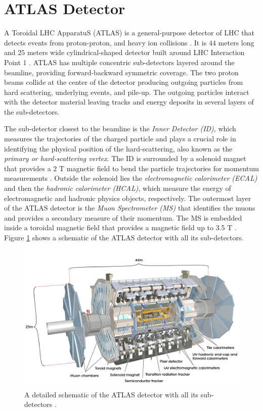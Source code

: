 \section{ATLAS Detector}
\label{sec:ATLAS}

A Toroidal LHC ApparatuS (ATLAS) is a general-purpose detector of LHC that detects events from proton-proton, and heavy ion collisions \cite{ATLAS}. It is $44$ meters long and $25$ meters wide cylindrical-shaped detector built around LHC Interaction Point 1 \cite{ATLAS}. ATLAS has multiple concentric sub-detectors layered around the beamline, providing forward-backward symmetric coverage. The two proton beams collide at the center of the detector producing outgoing particles from hard scattering, underlying events, and pile-up. The outgoing particles interact with the detector material leaving tracks and energy deposits in several layers of the sub-detectors. 

The sub-detector closest to the beamline is the \textit{Inner Detector (ID)}, which measures the trajectories of the charged particle and plays a crucial role in identifying the physical position of the hard-scattering, also known as the \textit{primary or hard-scattering vertex}. The ID is surrounded by a solenoid magnet that provides a $2$ T magnetic field to bend the particle trajectories for momentum measurements \cite{ATLAS}. Outside the solenoid lies the \textit{electromagnetic calorimeter (ECAL)} and then the \textit{hadronic calorimeter (HCAL)}, which measure the energy of electromagnetic and hadronic physics objects, respectively. The outermost layer of the ATLAS detector is the \textit{Muon Spectrometer (MS)} that identifies the muons and provides a secondary measure of their momentum. The MS is embedded inside a toroidal magnetic field that provides a magnetic field up to 3.5 T \cite{ATLAS}. Figure \ref{fig:ATLAS} shows a schematic of the ATLAS detector with all its sub-detectors.

\begin{figure}[!htb]
    \centering
    \includegraphics[width=.98\linewidth]{figures/LHC/AtlasDetector.png}
    \caption{ A detailed schematic of the ATLAS detector with all its sub-detectors \cite{ATLAS}.\label{fig:ATLAS}}
\end{figure}

